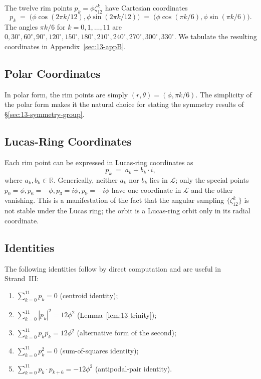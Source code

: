 The twelve rim points $p_{k} = \phi \zeta_{12}^{k}$ have Cartesian
coordinates
\[
  p_{k} \;=\; \bigl( \phi \cos(2\pi k / 12), \phi \sin(2\pi k / 12) \bigr)
       \;=\; \bigl( \phi \cos(\pi k / 6), \phi \sin(\pi k / 6) \bigr).
\]
The angles $\pi k / 6$ for $k = 0, 1, \ldots, 11$ are
$0, 30^{\circ}, 60^{\circ}, 90^{\circ}, 120^{\circ}, 150^{\circ},
180^{\circ}, 210^{\circ}, 240^{\circ}, 270^{\circ}, 300^{\circ},
330^{\circ}$. We tabulate the resulting coordinates in
Appendix~\ref{sec:13-appB}.

\subsection{Polar Coordinates}
\label{sec:13-polar}

In polar form, the rim points are simply $(r, \theta) = (\phi,
\pi k / 6)$. The simplicity of the polar form makes it the natural
choice for stating the symmetry results of \S\ref{sec:13-symmetry-group}.

\subsection{Lucas-Ring Coordinates}
\label{sec:13-lucas-ring-coords}

Each rim point can be expressed in Lucas-ring coordinates as
\[
  p_{k} \;=\; a_{k} + b_{k} \cdot i,
\]
where $a_{k}, b_{k} \in \mathbb{R}$. Generically, neither $a_{k}$
nor $b_{k}$ lies in $\mathcal{L}$; only the special points $p_{0} =
\phi, p_{6} = -\phi, p_{3} = i\phi, p_{9} = -i\phi$ have one
coordinate in $\mathcal{L}$ and the other vanishing. This is a
manifestation of the fact that the angular sampling
$\{\zeta_{12}^{k}\}$ is not stable under the Lucas ring; the orbit
is a Lucas-ring orbit only in its radial coordinate.

\subsection{Identities}
\label{sec:13-identities}

The following identities follow by direct computation and are
useful in Strand~III:

\begin{enumerate}
\item $\sum_{k=0}^{11} p_{k} = 0$ (centroid identity);
\item $\sum_{k=0}^{11} |p_{k}|^{2} = 12 \phi^{2}$
  (Lemma~\ref{lem:13-trinity});
\item $\sum_{k=0}^{11} p_{k} \bar{p_{k}} = 12 \phi^{2}$ (alternative
  form of the second);
\item $\sum_{k=0}^{11} p_{k}^{2} = 0$ (sum-of-squares identity);
\item $\sum_{k=0}^{11} p_{k} \cdot p_{k+6} = -12 \phi^{2}$
  (antipodal-pair identity).
\end{enumerate}

